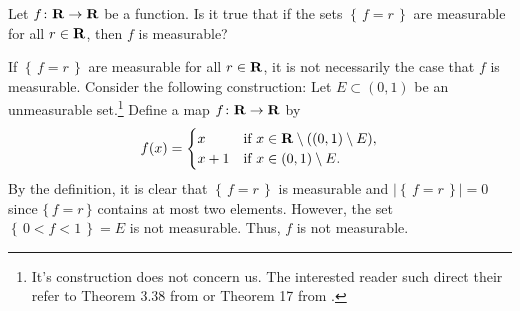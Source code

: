 \begin{problem}
  Let $f\colon\mathbf{R}\to\mathbf{R}$ be a function. Is it true that if the sets
  $\left\{\,f=r\,\right\}$ are measurable for all $r\in\mathbf{R}$, then $f$ is
  measurable?
\end{problem}
\begin{solution}
  If $\left\{\,f=r\,\right\}$ are measurable for all $r\in\mathbf{R}$, it is not
  necessarily the case that $f$ is measurable. Consider the following
  construction: Let $E\subset(0,1)$ be an unmeasurable set.\footnote{It's
    construction does not concern us. The interested reader such direct
    their refer to Theorem 3.38 from \cite[Ch.\@ 3, p.\@
    57-58]{wheeden-zygmund} or Theorem 17 from \cite[Ch.\@ 2\S 7, p.\@
    48]{royden}.} Define a map $f\colon\mathbf{R}\to\mathbf{R}$ by
  \begin{equation}
    \label{eq:prep:1:11}
    f(x)=
    \begin{cases}
      x&\text{if $x\in\mathbf{R}\setminus((0,1)\setminus E)$},\\
      x+1&\text{if $x\in (0,1)\setminus E$.}
    \end{cases}
  \end{equation}
  By the definition, it is clear that $\left\{\,f=r\,\right\}$ is
  measurable and $\left|\left\{\,f=r\,\right\}\right|=0$ since
  $\{\,f=r\,\}$ contains at most two elements. However, the set
  $\left\{\,0<f<1\,\right\}=E$ is not measurable. Thus, $f$ is not
  measurable.
\end{solution}

